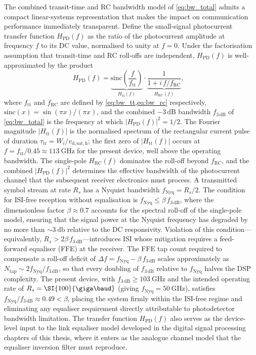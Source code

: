 The combined transit-time and RC bandwidth model of \cref{eq:bw_total} admits a compact linear-systems representation that makes the impact on communication performance immediately transparent. Define the small-signal photocurrent transfer function $H_\mathrm{PD}(f)$ as the ratio of the photocurrent amplitude at frequency $f$ to its DC value, normalised to unity at $f = 0$. Under the factorisation assumption that transit-time and RC roll-offs are independent, $H_\mathrm{PD}(f)$ is well-approximated by the product
\begin{equation}
    H_\mathrm{PD}(f)
    = \underbrace{\mathrm{sinc}\!\left(\frac{f}{f_\mathrm{tt}}\right)}_{H_\mathrm{tt}(f)}
    \cdot\underbrace{\frac{1}{1+i\,f/f_\mathrm{RC}}}_{H_\mathrm{RC}(f)},
    \label{eq:H_pd}
\end{equation}
where $f_\mathrm{tt}$ and $f_\mathrm{RC}$ are defined by \cref{eq:bw_tt,eq:bw_rc} respectively, $\mathrm{sinc}(x) = \sin(\pi x)/(\pi x)$, and the combined $-3\,\mathrm{dB}$ bandwidth $f_{3\,\mathrm{dB}}$ of \cref{eq:bw_total} is the frequency at which $|H_\mathrm{PD}(f)|^2 = 1/2$. The Fourier magnitude $|H_\mathrm{tt}(f)|$ is the normalised spectrum of the rectangular current pulse of duration $\tau_\mathrm{tr} = W_i/v_\mathrm{d,sat,h}$; the first zero of $|H_\mathrm{tt}(f)|$ occurs at $f = f_\mathrm{tt}/0.45 \approx \SI{113}{\giga\hertz}$ for the present device, well above the operating bandwidth. The single-pole $H_\mathrm{RC}(f)$ dominates the roll-off beyond $f_\mathrm{RC}$, and the combined $|H_\mathrm{PD}(f)|^2$ determines the effective bandwidth of the photocurrent channel that the subsequent receiver electronics must process. A transmitted symbol stream at rate $R_s$ has a Nyquist bandwidth $f_\mathrm{Nyq} = R_s/2$. The condition for ISI-free reception without equalisation is $f_\mathrm{Nyq} \leq \beta\,f_{3\,\mathrm{dB}}$, where the dimensionless factor $\beta \approx 0.7$ accounts for the spectral roll-off of the single-pole model, ensuring that the signal power at the Nyquist frequency has degraded by no more than $\sim\SI{3}{\decibel}$ relative to the DC responsivity. Violation of this condition—equivalently, $R_s > 2\beta\,f_{3\,\mathrm{dB}}$—introduces ISI whose mitigation requires a feed-forward equaliser (FFE) at the receiver. The FFE tap count required to compensate a roll-off deficit of $\Delta f = f_\mathrm{Nyq} - \beta\,f_{3\,\mathrm{dB}}$ scales approximately as $N_\mathrm{tap} \sim 2f_\mathrm{Nyq}/f_{3\,\mathrm{dB}}$, so that every doubling of $f_{3\,\mathrm{dB}}$ relative to $f_\mathrm{Nyq}$ halves the DSP complexity. The present device, with $f_{3\,\mathrm{dB}} \geq \SI{103}{\giga\hertz}$ and the intended operating rate of $R_s = \SI{100}{\giga\baud}$ (giving $f_\mathrm{Nyq} = \SI{50}{\giga\hertz}$), satisfies $f_\mathrm{Nyq}/f_{3\,\mathrm{dB}} \approx 0.49 < \beta$, placing the system firmly within the ISI-free regime and eliminating any equaliser requirement directly attributable to photodetector bandwidth limitation. The transfer function $H_\mathrm{PD}(f)$ also serves as the device-level input to the link equaliser model developed in the digital signal processing chapters of this thesis, where it enters as the analogue channel model that the equaliser inversion filter must reproduce.

